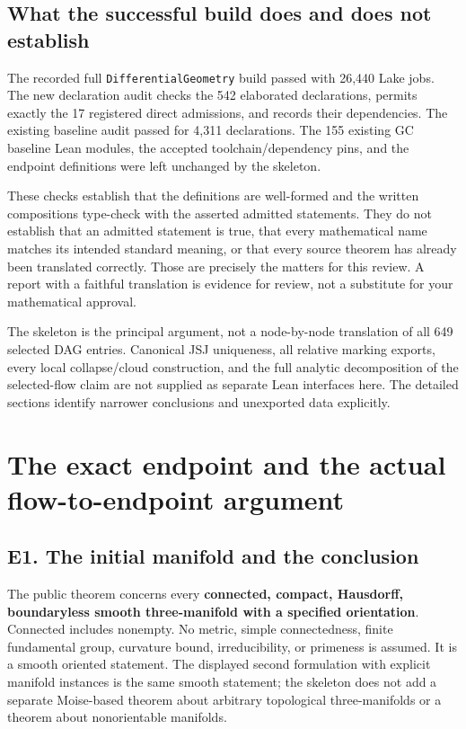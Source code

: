 \documentclass[
  letterpaper,
  11pt]{article}
\begin{document}
\subsection{What the successful build does and does not
establish}\label{meaning-of-build}

The recorded full {\small\texttt{Differential\allowbreak{}Geometry}}
build passed with 26,440 Lake jobs. The new declaration audit checks the
542 elaborated declarations, permits exactly the 17 registered direct
admissions, and records their dependencies. The existing baseline audit
passed for 4,311 declarations. The 155 existing GC baseline Lean
modules, the accepted toolchain/dependency pins, and the endpoint
definitions were left unchanged by the skeleton.

These checks establish that the definitions are well-formed and the
written compositions type-check with the asserted admitted statements.
They do not establish that an admitted statement is true, that every
mathematical name matches its intended standard meaning, or that every
source theorem has already been translated correctly. Those are
precisely the matters for this review. A report with a faithful
translation is evidence for review, not a substitute for your
mathematical approval.

The skeleton is the principal argument, not a node-by-node translation
of all 649 selected DAG entries. Canonical JSJ uniqueness, all relative
marking exports, every local collapse/cloud construction, and the full
analytic decomposition of the selected-flow claim are not supplied as
separate Lean interfaces here. The detailed sections identify narrower
conclusions and unexported data explicitly.

\section{The exact endpoint and the actual flow-to-endpoint
argument}\label{endpoint-flow}

\subsection{E1. The initial manifold and the
conclusion}\label{e1-endpoint}

The public theorem concerns every \textbf{connected, compact, Hausdorff,
boundaryless smooth three-manifold with a specified orientation}.
Connected includes nonempty. No metric, simple connectedness, finite
fundamental group, curvature bound, irreducibility, or primeness is
assumed. It is a smooth oriented statement. The displayed second
formulation with explicit manifold instances is the same smooth
statement; the skeleton does not add a separate Moise-based theorem
about arbitrary topological three-manifolds or a theorem about
nonorientable manifolds.
\end{document}
